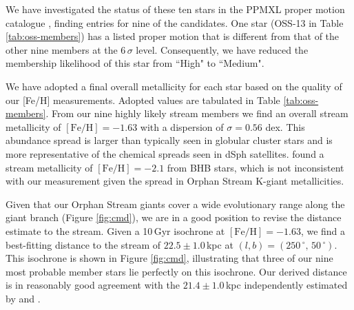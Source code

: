 \documentclass[10pt,apjl]{emulateapj}
\begin{document}
We have investigated the status of these ten stars in the PPMXL proper motion catalogue \citep{Roeser_et-al_2010}, finding entries for nine of the candidates. One star (OSS-13 in Table \ref{tab:oss-members}) has a listed proper motion that is different from that of the other nine members at the $6\,\sigma$ level. Consequently, we have reduced the membership likelihood of this star from ``High" to ``Medium".

We have adopted a final overall metallicity for each star based on the quality of our [Fe/H] measurements. Adopted values are tabulated in Table \ref{tab:oss-members}. From our nine highly likely stream members we find an overall stream metallicity of $[\mbox{Fe/H}] = -1.63$ with a dispersion of $\sigma = 0.56$ dex. This abundance spread is larger than typically seen in globular cluster stars and is more representative of the chemical spreads seen in dSph satellites. \citet{Newberg_et-al_2010} found a stream metallicity of $[\mbox{Fe/H}] = -2.1$ from BHB stars, which is not inconsistent with our measurement given the spread in Orphan Stream K-giant metallicities.

Given that our Orphan Stream giants cover a wide evolutionary range along the giant branch (Figure \ref{fig:cmd}), we are in a good position to revise the distance estimate to the stream. Given a 10\,Gyr \citet{Girardi_et-al_2008} isochrone at $[\mbox{Fe/H}] = -1.63$, we find a best-fitting distance to the stream of $22.5 \pm 1.0$\,kpc at $(l, b) = (250\,^\circ,\,50\,^\circ)$. This isochrone is shown in Figure \ref{fig:cmd}, illustrating that three of our nine most probable member stars lie perfectly on this isochrone. Our derived distance is in reasonably good agreement with the $21.4 \pm 1.0$\,kpc independently estimated by \citet{Grillmair_2006} and \citet{Newberg_et-al_2010}.
\end{document}
